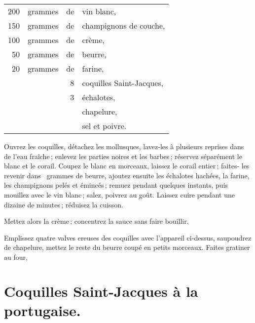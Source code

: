 \footnotesize
\begin{longtable}{rrrp{16em}}
    200 & grammes & de & vin blanc,                                                                       \\
    150 & grammes & de & champignons de couche,                                                           \\
    100 & grammes & de & crème,                                                                           \\
     50 & grammes & de & beurre,                                                                          \\
     20 & grammes & de & farine,                                                                          \\
        &         &  8 & coquilles Saint-Jacques,                                                         \\
        &         &  3 & échalotes,                                                                       \\
        &         &    & chapelure,                                                                       \\
        &         &    & sel et poivre.                                                                   \\
\end{longtable}
\normalsize

Ouvrez les coquilles, détachez les mollusques, lavez-les à plusieurs reprises
dans de l’eau fraîche ; enlevez les parties noires et les barbes ; réservez
séparément le blanc et le corail. Coupez le blanc en morceaux, laissez le
corail entier ; faites- les revenir dans {\mmm} grammes de beurre, ajoutez ensuite
les échalotes hachées, la farine, les champignons pelés et émincés ; remuez
pendant quelques instants, puis mouillez avec le vin blanc ; salez, poivrez au
goût. Laissez cuire pendant une dizaine de minutes ; réduisez la cuisson.

Mettez alors la crème ; concentrez la sauce sans faire bouillir.

Emplissez quatre valves creuses des coquilles avec l'appareil ci-dessus,
saupoudrez de chapelure, mettez le reste du beurre coupé en petits morceaux.
Faites gratiner au four,

\section*{\centering Coquilles Saint-Jacques à la portugaise.}

